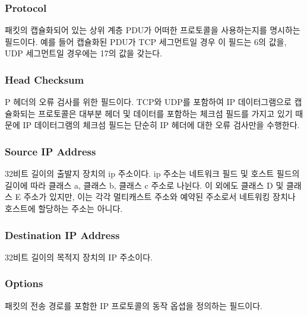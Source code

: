     \subsubsection*{Protocol}
    패킷의 캡슐화되어 있는 상위 계층 PDU가 어떠한 프로토콜을 사용하는지를 명시하는 필드이다. 예를 들어 캡슐화된 PDU가 TCP 세그먼트일 경우 이 필드는 6의 값을, UDP 세그먼트일 경우에는 17의 값을 갖는다.
    \vspace{-1mm}
    \subsubsection*{Head Checksum}
    P 헤더의 오류 검사를 위한 필드이다. TCP와 UDP를 포함하여 IP 데이터그램으로 캡슐화되는 프로토콜은 대부분 헤더 및 데이터를 포함하는 체크섬 필드를 가지고 있기 때문에 IP 데이터그램의 체크섬 필드는 단순히 IP 헤더에 대한 오류 검사만을 수행한다.
    \vspace{-1mm}
    \subsubsection*{Source IP Address }
    32비트 길이의 출발지 장치의 ip 주소이다. ip 주소는 네트워크 필드 및 호스트 필드의 길이에 따라 클래스 a, 클래스 b, 클래스 c 주소로 나뉜다. 이 외에도 클래스 D 및 클래스 E 주소가 있지만, 이는 각각 멀티캐스트 주소와 예약된 주소로서 네트워킹 장치나 호스트에 할당하는 주소는 아니다.
    \vspace{-1mm}
    \subsubsection*{Destination IP Address}
    32비트 길이의 목적지 장치의 IP 주소이다.
    \vspace{-1mm}
    \subsubsection*{Options}
    패킷의 전송 경로를 포함한 IP 프로토콜의 동작 옵셥을 정의하는 필드이다.